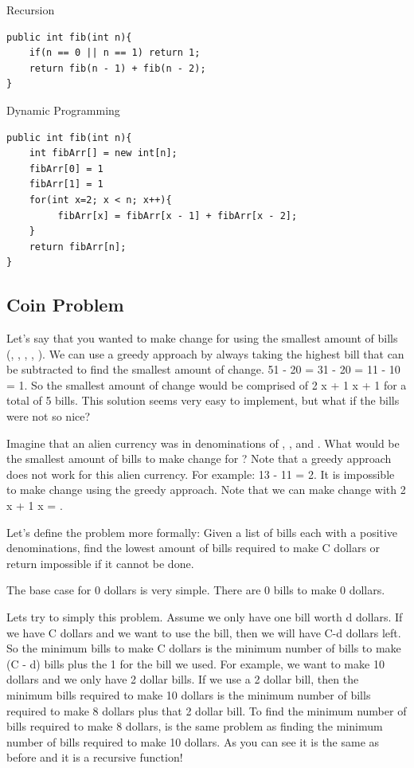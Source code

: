 \documentclass[11pt,oneside]{book}
\begin{document}
Recursion

\begin{lstlisting}
public int fib(int n){
    if(n == 0 || n == 1) return 1;
    return fib(n - 1) + fib(n - 2);
}
\end{lstlisting}

Dynamic Programming

\begin{lstlisting}
public int fib(int n){
    int fibArr[] = new int[n];
    fibArr[0] = 1
    fibArr[1] = 1
    for(int x=2; x < n; x++){
         fibArr[x] = fibArr[x - 1] + fibArr[x - 2];
    }
    return fibArr[n];
}
\end{lstlisting}

\subsection{Coin Problem}

Let's say that you wanted to make change for  using the smallest amount of bills (, , , , ). We can use a greedy approach by always taking the highest bill that can be subtracted to find the smallest amount of change. 51 - 20 = 31 - 20 = 11 - 10 = 1. So the smallest amount of change would be comprised of 2 x  + 1 x  + 1 for a total of 5 bills. This solution seems very easy to implement, but what if the bills were not so nice?

Imagine that an alien currency was in denominations of , ,  and . What would be the smallest amount of bills to make change for ? Note that a greedy approach does not work for this alien currency. For example: 13 - 11 = 2. It is impossible to make change using the greedy approach. Note that we can make change with 2 x  + 1 x  = .

Let's define the problem more formally: Given a list of bills each with a positive denominations, find the lowest amount of bills required to make C dollars or return impossible if it cannot be done.

The base case for 0 dollars is very simple. There are 0 bills to make 0 dollars.

Lets try to simply this problem. Assume we only have one bill worth d dollars. If we have C dollars and we want to use the bill, then we will have C-d dollars left. So the minimum bills to make C dollars is the minimum number of bills to make (C - d) bills plus the 1 for the bill we used. For example, we want to make 10 dollars and we only have 2 dollar bills. If we use a 2 dollar bill, then the minimum bills required to make 10 dollars is the minimum number of bills required to make 8 dollars plus that 2 dollar bill. To find the minimum number of bills required to make 8 dollars, is the same problem as finding the minimum number of bills required to make 10 dollars. As you can see it is the same as before and it is a recursive function!
\end{document}
